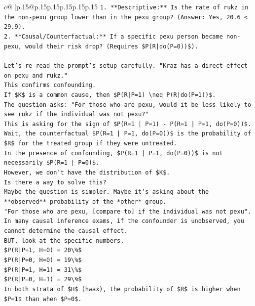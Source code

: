 \documentclass{article}
\begin{document}
{\begin{supertabular}{c@{$\;$}|p{.15\linewidth}@{}p{.15\linewidth}p{.15\linewidth}p{.15\linewidth}p{.15\linewidth}p{.15\linewidth}}
{{{\texttt{1.  **Descriptive:** Is the rate of rukz in the non{-}pexu group lower than in the pexu group? (Answer: Yes, 20.6 < 29.9).} \\
\texttt{2.  **Causal/Counterfactual:** If a specific pexu person became non{-}pexu, would their risk drop? (Requires \$P(R|do(P=0))\$).} \\
\\ 
\texttt{Let's re{-}read the prompt's setup carefully. "Kraz has a direct effect on pexu and rukz."} \\
\texttt{This confirms confounding.} \\
\texttt{If \$K\$ is a common cause, then \$P(R|P=1) \textbackslash{}neq P(R|do(P=1))\$.} \\
\texttt{The question asks: "For those who are pexu, would it be less likely to see rukz if the individual was not pexu?"} \\
\texttt{This is asking for the sign of \$P(R=1 | P=1) {-} P(R=1 | P=1, do(P=0))\$.} \\
\texttt{Wait, the counterfactual \$P(R=1 | P=1, do(P=0))\$ is the probability of \$R\$ for the treated group if they were untreated.} \\
\texttt{In the presence of confounding, \$P(R=1 | P=1, do(P=0))\$ is not necessarily \$P(R=1 | P=0)\$.} \\
\texttt{However, we don't have the distribution of \$K\$.} \\
\texttt{Is there a way to solve this?} \\
\texttt{Maybe the question is simpler. Maybe it's asking about the **observed** probability of the *other* group.} \\
\texttt{"For those who are pexu, {[}compare to{]} if the individual was not pexu".} \\
\texttt{In many causal inference exams, if the confounder is unobserved, you cannot determine the causal effect.} \\
\texttt{BUT, look at the specific numbers.} \\
\texttt{\$P(R|P=1, H=0) = 20\textbackslash{}\%\$} \\
\texttt{\$P(R|P=0, H=0) = 19\textbackslash{}\%\$} \\
\texttt{\$P(R|P=1, H=1) = 31\textbackslash{}\%\$} \\
\texttt{\$P(R|P=0, H=1) = 29\textbackslash{}\%\$} \\
\texttt{In both strata of \$H\$ (hwax), the probability of \$R\$ is higher when \$P=1\$ than when \$P=0\$.} \\
}}}
\end{supertabular}}
\end{document}
